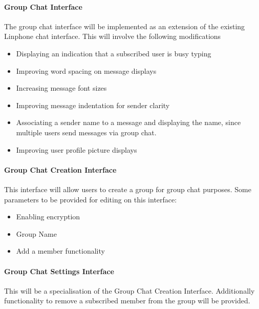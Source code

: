 \documentclass[11pt]{article}
\begin{document}
\paragraph{Group Chat Interface} The group chat interface will be implemented as an extension of the existing Linphone chat interface. This will involve the following modifications
\begin{itemize}
\item Displaying an indication that a subscribed user is busy typing
\item Improving word spacing on message displays
\item Increasing message font sizes
\item Improving message indentation for sender clarity
\item Associating a sender name to a message and displaying the name, since multiple users send messages via group chat.
\item Improving user profile picture displays
\end{itemize}
\paragraph{Group Chat Creation Interface} This interface will allow users to create a group for group chat purposes. Some parameters to be provided for editing on this interface:
\begin{itemize}
\item Enabling encryption
\item Group Name
\item Add a member functionality
\end{itemize}
\paragraph{Group Chat Settings Interface} This will be a specialisation of the Group Chat Creation Interface. Additionally functionality to remove a subscribed member from the group will be provided.

\newpage
\end{document}
